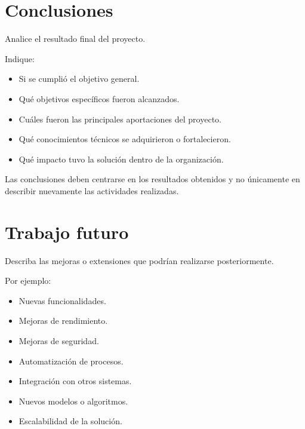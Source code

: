\documentclass[12pt,a4paper]{article}
\begin{document}

\section{Conclusiones}

Analice el resultado final del proyecto.

Indique:

\begin{itemize}
    \item Si se cumplió el objetivo general.
    \item Qué objetivos específicos fueron alcanzados.
    \item Cuáles fueron las principales aportaciones del proyecto.
    \item Qué conocimientos técnicos se adquirieron o fortalecieron.
    \item Qué impacto tuvo la solución dentro de la organización.
\end{itemize}

Las conclusiones deben centrarse en los resultados obtenidos y no únicamente
en describir nuevamente las actividades realizadas.


\section{Trabajo futuro}

Describa las mejoras o extensiones que podrían realizarse posteriormente.

Por ejemplo:

\begin{itemize}
    \item Nuevas funcionalidades.
    \item Mejoras de rendimiento.
    \item Mejoras de seguridad.
    \item Automatización de procesos.
    \item Integración con otros sistemas.
    \item Nuevos modelos o algoritmos.
    \item Escalabilidad de la solución.
\end{itemize}
\end{document}
